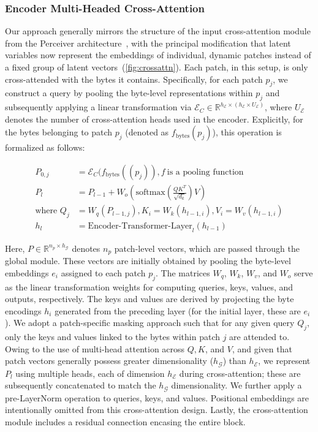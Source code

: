 \subsubsection{Encoder Multi-Headed Cross-Attention}
\label{sec:enc-cross-attn}
Our approach generally mirrors the structure of the input cross-attention module from the Perceiver architecture~\citep{jaegle2021perceiver}, with the principal modification that latent variables now represent the embeddings of individual, dynamic patches instead of a fixed group of latent vectors~(\autoref{fig:crossattn}). Each patch, in this setup, is only cross-attended with the bytes it contains. Specifically, for each patch $p_j$, we construct a query by pooling the byte-level representations within $p_j$ and subsequently applying a linear transformation via $\mathcal{E}_{C} \in \mathbb{R}^{h_{\mathcal{E}} \times (h_{\mathcal{E}} \times U_{\mathcal{E}})}$, where $U_{\mathcal{E}}$ denotes the number of cross-attention heads used in the encoder. Explicitly, for the bytes belonging to patch $p_j$ (denoted as $f_{\text{bytes}}(p_j)$), this operation is formalized as follows:

\begin{align}
P_{0,j} &= \mathcal{E}_{C}(f_\text{bytes}((p_j)), f~ \text{is a pooling function} \\
P_l &= P_{l-1} + W_o\left(\text{softmax}\left(\frac{QK^T}{\sqrt{d_k}}\right)V\right) \\
\text{where } Q_j &= W_q(P_{l-1,j}), K_i = W_k(h_{l-1,i}), V_i = W_v(h_{l-1,i}) \\
h_l &= \text{Encoder-Transformer-Layer}_l(h_{l-1})
\end{align}

Here, $P \in \mathbb{R}^{n_p \times h_{\mathcal{G}}}$ denotes $n_p$ patch-level vectors, which are passed through the global module. These vectors are initially obtained by pooling the byte-level embeddings $e_i$ assigned to each patch $p_j$. The matrices $W_q$, $W_k$, $W_v$, and $W_o$ serve as the linear transformation weights for computing queries, keys, values, and outputs, respectively. The keys and values are derived by projecting the byte encodings $h_i$ generated from the preceding layer (for the initial layer, these are $e_i$). We adopt a patch-specific masking approach such that for any given query $Q_j$, only the keys and values linked to the bytes within patch $j$ are attended to. Owing to the use of multi-head attention across $Q, K$, and $V$, and given that patch vectors generally possess greater dimensionality ($h_{\mathcal{G}}$) than $h_{\mathcal{E}}$, we represent $P_l$ using multiple heads, each of dimension $h_{\mathcal{E}}$ during cross-attention; these are subsequently concatenated to match the $h_{\mathcal{G}}$ dimensionality. We further apply a pre-LayerNorm operation to queries, keys, and values. Positional embeddings are intentionally omitted from this cross-attention design. Lastly, the cross-attention module includes a residual connection encasing the entire block.

